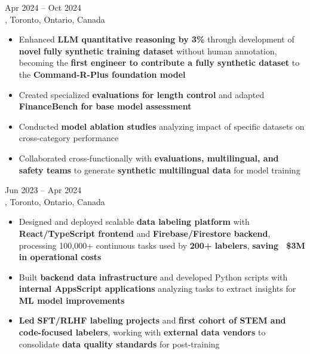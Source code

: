 \documentclass[letterpaper,10pt]{article}
\begin{document}
\hspace{0.15in}{\large\bfseries Machine Learning Engineer Intern} \hfill {\small Apr 2024 -- Oct 2024} \\
\hspace{0.15in}{\bfseries Cohere}, Toronto, Ontario, Canada
\vspace{-1pt}
\begin{itemize}[leftmargin=0.35in, itemsep=-1pt, topsep=1pt, labelsep=0.035in]
\item Enhanced \textbf{LLM quantitative reasoning by 3\%} through development of \textbf{novel} \textbf{fully synthetic training dataset} without human annotation, becoming the \textbf{first engineer to contribute a fully synthetic dataset} to the \textbf{Command-R-Plus foundation model}
\item Created specialized \textbf{evaluations for length control} and adapted \textbf{FinanceBench for base model assessment}
\item Conducted \textbf{model ablation studies} analyzing impact of specific datasets on cross-category performance
\item Collaborated cross-functionally with \textbf{evaluations, multilingual, and safety teams} to generate \textbf{synthetic multilingual data} for model training
\end{itemize}
\vspace{1pt}

\hspace{0.15in}{\large\bfseries Senior Data Quality Team Lead} \hfill {\small Jun 2023 -- Apr 2024} \\
\hspace{0.15in}{\bfseries Cohere}, Toronto, Ontario, Canada
\vspace{-1pt}
\begin{itemize}[leftmargin=0.35in, itemsep=-1pt, topsep=1pt, labelsep=0.035in]
\item Designed and deployed scalable \textbf{data labeling platform} with \textbf{React/TypeScript frontend} and \textbf{Firebase/Firestore backend}, processing 100,000+ continuous tasks used by \textbf{200+ labelers}, \textbf{saving ~\$3M in operational costs}
\item Built \textbf{backend data infrastructure} and developed Python scripts with \textbf{internal AppsScript applications} analyzing tasks to extract insights for \textbf{ML model improvements}
\item \textbf{Led} \textbf{SFT/RLHF labeling projects} and \textbf{first cohort of STEM and code-focused labelers}, working with \textbf{external data vendors} to consolidate \textbf{data quality standards} for post-training
\end{itemize}
\vspace{1pt}
\end{document}
